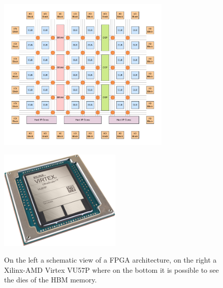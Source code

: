 \documentclass[../../main.tex]{subfiles}
\begin{document}
\begin{figure}[h]
    \begin{minipage}[c]{0.63\linewidth}
        \vspace{0pt}
        \centering
            \includegraphics[width=8.2cm]{sections/04/Images/FPGA_struct.pdf}
            \label{fig:preliminary_ssb_bkg_waveform}
    \end{minipage}%
    \hfill%
    \begin{minipage}[c]{0.37\linewidth}
        \vspace{0pt}
        \centering
            \includegraphics[width=5.8cm]{sections/04/Images/VirtexHBM.png}
            \label{fig:preliminary_ssb_bkg_integrals}
    \end{minipage}%
    \caption{On the left a schematic view of a FPGA architecture, on the right a Xilinx-AMD Virtex VU57P where on the bottom it is possible to see  the dies of the HBM memory.}
    \label{fig:FPGA_Arch}
\end{figure}
    
\end{document}
